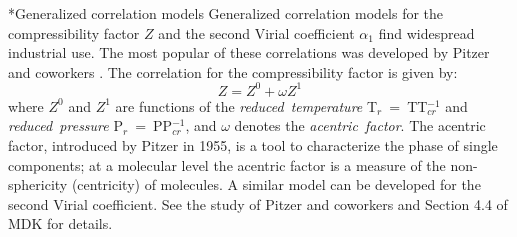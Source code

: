 \documentclass[11pt]{article}
\makeatletter
\theoremstyle{definition}
\renewcommand\subsection{\@startsection
	{subsection}{2}{0mm}
	{-0.05in}
	{0.5\baselineskip}
	{\normalfont\normalsize\bfseries}}
\makeatother
\begin{document}
\subsection*{Generalized correlation models}
Generalized correlation models for the compressibility factor $Z$ and the second Virial coefficient $\alpha_{1}$ find widespread industrial use.
The most popular of these correlations was developed by Pitzer and coworkers \cite{Pitzer1955}.
The correlation for the compressibility factor is given by:
\begin{equation}
	Z = Z^{0}+\omega Z^{1}
\end{equation}where $Z^{0}$ and $Z^{1}$ are functions of the \textit{reduced~temperature} T$_{r}$~=~TT$_{cr}^{-1}$ and \textit{reduced~pressure} P$_{r}$~=~PP$_{cr}^{-1}$,
and $\omega$ denotes the \textit{acentric~factor}.
The acentric factor, introduced by Pitzer in 1955, is a tool to characterize the phase of single components;
at a molecular level the acentric factor is a measure of the non-sphericity (centricity) of molecules.
A similar model can be developed for the second Virial coefficient.
See the study of Pitzer and coworkers \cite{Pitzer1955} and Section 4.4 of MDK for details.



\end{document}

